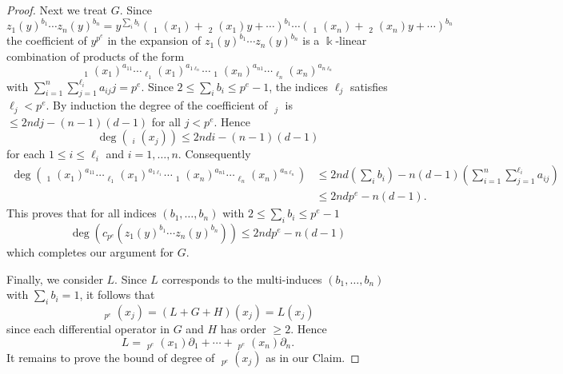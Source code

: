 \documentclass[11pt]{amsart}
\theoremstyle{definition}
\theoremstyle{remark}
\numberwithin{equation}{subsection}
\DeclareMathOperator{\kk}{\Bbbk}
\DeclareMathOperator{\tp}{\tilde{\partial}}
\begin{document}
\begin{proof}
Next we treat $G$. Since 
\[z_1(y)^{b_1}\cdots z_n(y)^{b_n}=y^{\sum_ib_i}(\tp_{1}(x_1)+\tp_{2}(x_1)y+\cdots)^{b_1}\cdots (\tp_{1}(x_n)+\tp_{2}(x_n)y+\cdots)^{b_n}\]
the coefficient of $y^{p^e}$ in the expansion of $z_1(y)^{b_1}\cdots z_n(y)^{b_n}$ is a $\kk$-linear combination of products of the form 
\[\tp_1(x_1)^{a_{11}}\cdots \tp_{\ell_1}(x_1)^{a_{1\ell_n}}\cdots \tp_1(x_n)^{a_{n1}}\cdots \tp_{\ell_n}(x_n)^{a_{n\ell_n}}\]
with $\sum_{i=1}^n\sum_{j=1}^{\ell_i}a_{ij}j=p^e$. Since $2\leq \sum_ib_i\leq p^e-1$, the indices $\ell_j$ satisfies $\ell_j<p^e$. By induction the degree of the coefficient of $\tp_j$ is $\leq 2ndj-(n-1)(d-1)$ for all $j<p^e$. Hence 
\[\deg(\tp_i(x_j))\leq 2ndi-(n-1)(d-1)\]
 for each $1\leq i\leq \ell_i$ and $i=1,\dots,n$. Consequently
 \begin{align*}
 \deg(\tp_1(x_1)^{a_{11}}\cdots \tp_{\ell_1}(x_1)^{a_{1\ell_1}}\cdots \tp_1(x_n)^{a_{n1}}\cdots \tp_{\ell_n}(x_n)^{a_{n\ell_n}})&\leq 2nd(\sum_ib_i)-n(d-1)(\sum_{i=1}^n\sum_{j=1}^{\ell_i} a_{ij})\\
 &\leq 2ndp^e-n(d-1).
 \end{align*}
This proves that for all indices $(b_1,\dots,b_n)$ with $2\leq \sum_ib_i\leq p^e-1$
\[\deg(c_{p^e}(z_1(y)^{b_1}\cdots z_n(y)^{b_n}))\leq 2ndp^e-n(d-1)\]
 which completes our argument for $G$.
 
 Finally, we consider $L$. Since $L$ corresponds to the multi-induces $(b_1,\dots,b_n)$ with $\sum_ib_i=1$, it follows that
\[\tp_{p^e}(x_j)=(L+G+H)(x_j)=L(x_j)\]
since each differential operator in $G$ and $H$ has order $\geq 2$. Hence
\[L=\tp_{p^e}(x_1)\partial_1+\cdots +\tp_{p^e}(x_n)\partial_n.\]
It remains to prove the bound of degree of $\tp_{p^e}(x_j)$ as in our Claim. 


\end{proof}
\end{document}
